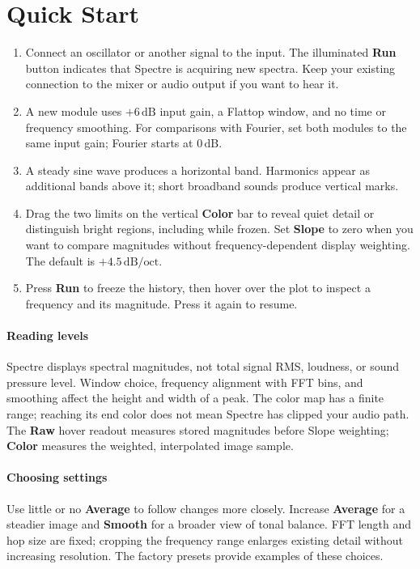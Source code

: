 \section{Quick Start}\label{sec:quick-start}

\begin{enumerate}
  \item Connect an oscillator or another signal to the input. The illuminated
  \textbf{Run} button indicates that Spectre is acquiring new spectra.
  Keep your existing connection to the mixer or audio output if you want to
hear it.
  \item A new module uses $+6\,\mathrm{dB}$ input gain, a Flattop window,
  and no time or frequency smoothing. For comparisons with Fourier, set
  both modules to the same input gain; Fourier starts at $0\,\mathrm{dB}$.
  \item A steady sine wave produces a horizontal band. Harmonics appear as
  additional bands above it; short broadband sounds produce vertical marks.
  \item Drag the two limits on the vertical \textbf{Color} bar to reveal quiet detail or
  distinguish bright regions, including while frozen. Set \textbf{Slope} to zero when you
  want to compare magnitudes without frequency-dependent display weighting.
  The default is $+4.5\,\mathrm{dB/oct}$.
  \item Press \textbf{Run} to freeze the history, then hover over the plot to
  inspect a frequency and its magnitude. Press it again to resume.
\end{enumerate}

\paragraph{Reading levels} Spectre displays spectral magnitudes, not total
signal RMS, loudness, or sound pressure level. Window choice, frequency
alignment with FFT bins, and smoothing affect the height and width of a peak.
The color map has a finite range; reaching its end color does not mean Spectre
has clipped your audio path. The \textbf{Raw} hover readout measures stored magnitudes before Slope
weighting; \textbf{Color} measures the weighted, interpolated image sample.

\paragraph{Choosing settings} Use little or no \textbf{Average} to follow
changes more closely. Increase \textbf{Average} for a steadier image and
\textbf{Smooth} for a broader view of tonal balance. FFT length and hop size
are fixed; cropping the frequency range enlarges existing detail without
increasing resolution. The factory presets provide examples of these choices.
